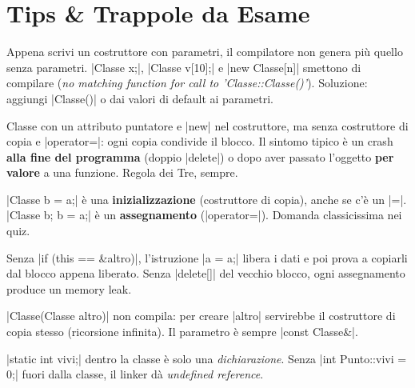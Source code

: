 \section{Tips \& Trappole da Esame}

\begin{trappola}
Appena scrivi un costruttore con parametri, il compilatore non genera più quello
senza parametri. \cc|Classe x;|, \cc|Classe v[10];| e \cc|new Classe[n]| smettono
di compilare (\emph{no matching function for call to 'Classe::Classe()'}).
Soluzione: aggiungi \cc|Classe()| o dai valori di default ai parametri.
\end{trappola}

\begin{trappola}
Classe con un attributo puntatore e \cc|new| nel costruttore, ma senza costruttore
di copia e \cc|operator=|: ogni copia condivide il blocco. Il sintomo tipico è un
crash \textbf{alla fine del programma} (doppio \cc|delete|) o dopo aver passato
l'oggetto \textbf{per valore} a una funzione. Regola dei Tre, sempre.
\end{trappola}

\begin{trappola}
\cc|Classe b = a;| è una \textbf{inizializzazione} (costruttore di copia), anche se
c'è un \cc|=|. \cc|Classe b; b = a;| è un \textbf{assegnamento} (\cc|operator=|).
Domanda classicissima nei quiz.
\end{trappola}

\begin{trappola}[: operator= senza controllo e senza delete]
Senza \cc|if (this == &altro)|, l'istruzione \cc|a = a;| libera i dati e poi prova a
copiarli dal blocco appena liberato. Senza \cc|delete[]| del vecchio blocco, ogni
assegnamento produce un memory leak.
\end{trappola}

\begin{trappola}
\cc|Classe(Classe altro)| non compila: per creare \cc|altro| servirebbe il
costruttore di copia stesso (ricorsione infinita). Il parametro è sempre
\cc|const Classe&|.
\end{trappola}

\begin{trappola}
\cc|static int vivi;| dentro la classe è solo una \emph{dichiarazione}. Senza
\cc|int Punto::vivi = 0;| fuori dalla classe, il linker dà \emph{undefined reference}.
\end{trappola}

